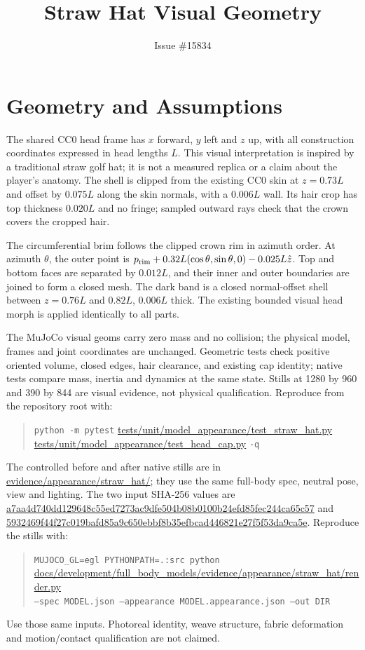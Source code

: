 \documentclass[11pt]{article}
\title{Straw Hat Visual Geometry}
\date{Issue \#15834}
\begin{document}
\maketitle
\section{Geometry and Assumptions}
The shared CC0 head frame has $x$ forward, $y$ left and $z$ up, with all
construction coordinates expressed in head lengths $L$. This visual
interpretation is inspired by a traditional straw golf hat; it is not a
measured replica or a claim about the player's anatomy. The shell is clipped
from the existing CC0 skin at $z=0.73L$ and offset by $0.075L$ along the skin
normals, with a $0.006L$ wall. Its hair crop has top thickness $0.020L$ and
no fringe; sampled outward rays check that the crown covers the cropped hair.

The circumferential brim follows the clipped crown rim in azimuth order. At
azimuth $\theta$, the outer point is $p_{\rm rim}+0.32L(\cos\theta,\sin\theta,0)
-0.025L\hat z$. Top and bottom faces are separated by $0.012L$, and their
inner and outer boundaries are joined to form a closed mesh. The dark band is
a closed normal-offset shell between $z=0.76L$ and $0.82L$, $0.006L$ thick.
The existing bounded visual head morph is applied identically to all parts.

The MuJoCo visual geoms carry zero mass and no collision; the physical model,
frames and joint coordinates are unchanged. Geometric tests check positive
oriented volume, closed edges, hair clearance, and existing cap identity;
native tests compare mass, inertia and dynamics at the same state. Stills at
1280 by 960 and 390 by 844 are visual evidence, not physical qualification.
Reproduce from the repository root with:
\begin{quote}\small\raggedright
\texttt{python -m pytest} \url{tests/unit/model_appearance/test_straw_hat.py}
\url{tests/unit/model_appearance/test_head_cap.py} \texttt{-q}
\end{quote}
The controlled before and after native stills are in
\url{evidence/appearance/straw_hat/}; they use the same full-body spec,
neutral pose, view and lighting. The two input SHA-256 values are
\url{a7aa4d740dd129648c55ed7273ac9dfe504b08b0100b24efd85fec244ca65c57}
and \url{5932469f44f27c019bafd85a9c650ebbf8b35efbcad446821e27f5f53da9ca5e}.
Reproduce the stills with:
\begin{quote}\small\raggedright
\texttt{MUJOCO\_GL=egl PYTHONPATH=.:src python}\\
\url{docs/development/full_body_models/evidence/appearance/straw_hat/render.py}\\
\texttt{--spec MODEL.json --appearance MODEL.appearance.json --out DIR}
\end{quote}
Use those same inputs. Photoreal identity,
weave structure, fabric deformation and motion/contact qualification are not
claimed.
\end{document}
